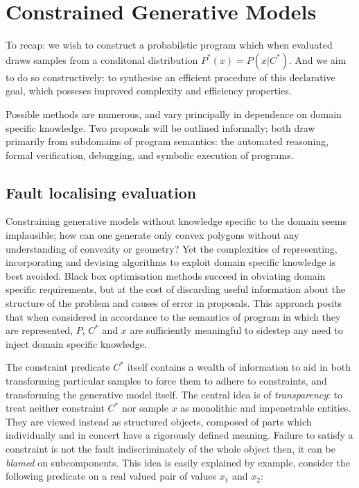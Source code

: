 

\chapter{Constrained Generative Models}

To recap: we wish to construct a probabilstic program which when evaluated draws samples from a conditonal distribution $P^*(x) = P(x \vert C^*)$.
And we aim to do so constructively: to synthesise an efficient procedure of this declarative goal, which posseses improved complexity and efficiency properties.

Possible methods are numerous, and vary principally in dependence on domain specific knowledge.
Two proposals will be outlined informally; both draw primarily from subdomains of program semantics: the automated reasoning, formal verification, debugging, and symbolic execution of programs.

\section{Fault localising evaluation}
Constraining generative models without knowledge specific to the domain seems implausible; how can one generate only convex polygons without any understanding of convexity or geometry?
Yet the complexities of representing, incorporating and devising algorithms to exploit domain specific knowledge is best avoided.
Black box optimisation methods succeed in obviating domain specific requirements, but at the cost of discarding useful information about the structure of the problem and causes of error in proposals.
This approach posits that when considered in accordance to the semantics of program in which they are represented, $P$, $C^*$ and $x$ are sufficiently meaningful to sidestep any need to inject domain specific knowledge.

The constraint predicate $C^*$ itself contains a wealth of information to aid in both transforming particular samples to force them to adhere to constraints, and transforming the generative model itself.
The central idea is of \textit{transparency}: to treat neither constraint $C^*$ nor sample $x$ as monolithic and impenetrable entities.
They are viewed instead as structured objects, composed of parts which individually and in concert have a rigorously defined meaning.
Failure to satisfy a constraint is not the fault indiscriminately of the whole object then, it can be {\em blamed} on subcomponents.
This idea is easily explained by example, consider the following predicate on a real valued pair of values $x_1$ and $x_2$:

